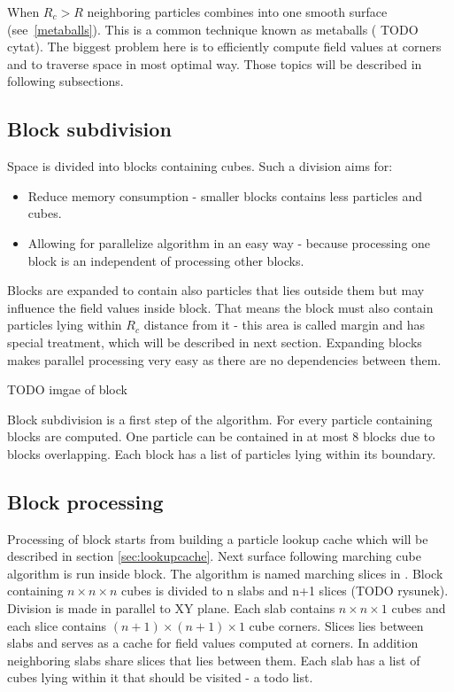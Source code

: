When $R_c > R$ neighboring particles combines into one smooth surface  (see~\ref{metaballs}). This is a common technique known as metaballs ( TODO cytat). The biggest problem here is to efficiently compute field values at corners and to traverse space in most optimal way. Those topics will be described in following subsections.
 

\subsection{Block subdivision} \label{sec:block_subdivision}
Space is divided into blocks containing cubes. Such a division aims for:
\begin{itemize}
\item Reduce memory consumption - smaller blocks contains less particles and cubes. 
\item Allowing for parallelize algorithm in an easy way - because processing one block is an independent of processing other blocks. 
\end{itemize}
Blocks are expanded to contain also particles that lies outside them but may influence the field values inside block. That means the block must also contain particles lying within $R_c$ distance from it - this area is called margin and has special treatment, which will be described in next section. Expanding blocks makes parallel processing very easy as there are no dependencies between them.

TODO imgae of block

Block subdivision is a first step of the algorithm. For every particle containing blocks are computed. One particle can be contained in at most 8 blocks due to blocks overlapping. Each block has a list of particles lying within its boundary. 

\subsection{Block processing} \label{sec:block_processing}
Processing of block starts from building a particle lookup cache which will be described in section \ref{sec:lookupcache}. Next surface following marching cube algorithm is run inside block. The algorithm is named marching slices in \cite{RosenbergBirdwell2008}. Block containing $n \times n \times n$ cubes is divided to n slabs and n+1 slices (TODO rysunek). Division is made in parallel to XY plane. Each slab contains $n \times n \times 1$ cubes and each slice contains $(n+1) \times (n+1) \times 1$ cube corners. Slices lies between slabs and serves as a cache for field values computed at corners. In addition neighboring slabs share slices that lies between them. Each slab has a list of cubes lying within it that should be visited - a todo list.

